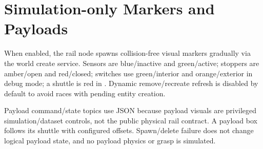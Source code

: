 \section{Simulation-only Markers and Payloads}

When enabled, the rail node spawns collision-free visual markers gradually via
the world create service. Sensors are blue/inactive and green/active; stoppers
are amber/open and red/closed; switches use green/interior and orange/exterior
in debug mode; a shuttle is red in . Dynamic remove/recreate
refresh is disabled by default to avoid races with pending entity creation.

Payload command/state topics use JSON because payload visuals are privileged
simulation/dataset controls, not the public physical rail contract. A payload
box follows its shuttle with configured offsets. Spawn/delete failure does not
change logical payload state, and no payload physics or grasp is simulated.
